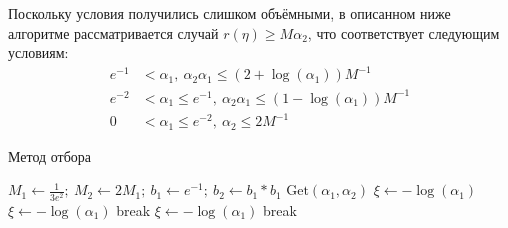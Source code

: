 \documentclass[specialist,
substylefile = spbu_report.rtx,
subf,href,colorlinks=true, 12pt]{disser}
\begin{document}
	Поскольку условия получились слишком объёмными, в описанном ниже алгоритме рассматривается случай $r(\eta) \geqslant M\alpha_2$, что соответствует следующим условиям:
	\begin{align*}
		e^{-1}&<\alpha_1,~\alpha_2\alpha_1\leqslant(2+\log(\alpha_1))M^{-1}
		\\e^{-2}&<\alpha_1\leqslant e^{-1},~\alpha_2\alpha_1\leqslant(1-\log(\alpha_1))M^{-1}
		\\0&<\alpha_1\leqslant e^{-2},~\alpha_2\leqslant2M^{-1}
	\end{align*}
	\begin{algorithm}[h]
		\caption{Метод отбора}
		\begin{algorithmic}[1]
			\State $M_1\gets\frac{1}{3e^2};~M_2\gets2M_1;~b_1\gets e^{-1};~b_2\gets b_1*b_1$
			\State $\mathrm{Get}(\alpha_1,\alpha_2)$
			\State $\xi\gets-\log(\alpha_1)$
			\EndIf
			\State $\xi\gets-\log(\alpha_1)$
			\State break
			\EndIf
			\State $\xi\gets-\log(\alpha_1)$
			\State break
			\EndIf
			\EndWhile
		\end{algorithmic}
	\end{algorithm}
\end{document}
